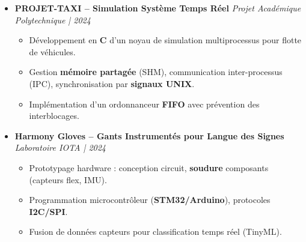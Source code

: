 \documentclass[a4paper,11pt]{article}
\begin{document}
\begin{itemize}[leftmargin=*, label={-}]
\item \textbf{PROJET-TAXI -- Simulation Système Temps Réel} \hfill \textit{Projet Académique Polytechnique | 2024}
\vspace{-2pt}
    \begin{itemize}[leftmargin=0.4cm, nosep, label=\tiny$\bullet$]
        \item \small{Développement en \textbf{C} d'un noyau de simulation multiprocessus pour flotte de véhicules.}
        \item \small{Gestion \textbf{mémoire partagée} (SHM), communication inter-processus (IPC), synchronisation par \textbf{signaux UNIX}.}
        \item \small{Implémentation d'un ordonnanceur \textbf{FIFO} avec prévention des interblocages.}
    \end{itemize}
\vspace{3pt}

\item \textbf{Harmony Gloves -- Gants Instrumentés pour Langue des Signes} \hfill \textit{Laboratoire IOTA | 2024}
\vspace{-2pt}
    \begin{itemize}[leftmargin=0.4cm, nosep, label=\tiny$\bullet$]
        \item \small{Prototypage hardware : conception circuit, \textbf{soudure} composants (capteurs flex, IMU).}
        \item \small{Programmation microcontrôleur (\textbf{STM32/Arduino}), protocoles \textbf{I2C/SPI}.}
        \item \small{Fusion de données capteurs pour classification temps réel (TinyML).}
    \end{itemize}

\end{itemize}

\end{document}
